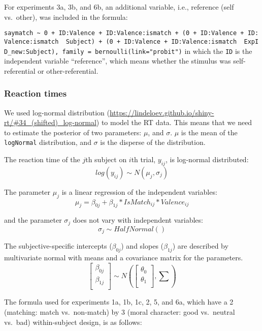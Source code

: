 \documentclass[
  man]{apa6}
\begin{document}
For experiments 3a, 3b, and 6b, an additional variable, i.e., reference (self vs.~other), was included in the formula:

\texttt{saymatch\ \textasciitilde{}\ 0\ +\ ID:Valence\ +\ ID:Valence:ismatch\ +\ (0\ +\ ID:Valence\ +\ ID:Valence:ismatch\ \textbar{}\ Subject)\ +\ (0\ +\ ID:Valence\ +\ ID:Valence:ismatch\ \textbar{}\ ExpID\_new:Subject),\ family\ =\ bernoulli(link="probit")}
in which the \texttt{ID} is the independent variable ``reference'', which means whether the stimulus was self-referential or other-referential.

\hypertarget{reaction-times}{%
\subsubsection{Reaction times}\label{reaction-times}}

We used log-normal distribution (\url{https://lindeloev.github.io/shiny-rt/\#34_(shifted)_log-normal}) to model the RT data. This means that we need to estimate the posterior of two parameters: \(\mu\), and \(\sigma\). \(\mu\) is the mean of the \texttt{logNormal} distribution, and \(\sigma\) is the disperse of the distribution.

The reaction time of the \(j\)th subject on \(i\)th trial, \(y_{ij}\), is log-normal distributed:
\[ log(y_{ij}) \sim N(\mu_{j}, \sigma_{j})\]

The parameter \(\mu_{j}\) is a linear regression of the independent variables:
\[\mu_{j} = \beta_{0j} + \beta_{1j}*IsMatch_{ij} * Valence_{ij}\]

and the parameter \(\sigma_{j}\) does not vary with independent variables:
\[\sigma_{j} \sim HalfNormal()\]

The subjective-specific intercepts (\(\beta_{0j}\)) and slopes (\(\beta_{1j}\)) are described by multivariate normal with means and a covariance matrix for the parameters.
\[ \begin{bmatrix}\beta_{0j}\\
\beta_{1j}\\
\end{bmatrix} \sim N(\begin{bmatrix}\theta_{0}\\
\theta_{1}\\
\end{bmatrix}, \sum) \]

The formula used for experiments 1a, 1b, 1c, 2, 5, and 6a, which have a 2 (matching: match vs.~non-match) by 3 (moral character: good vs.~neutral vs.~bad) within-subject design, is as follows:
\end{document}
